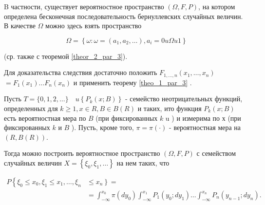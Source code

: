 B частности, существует вероятностное пространство $(\Omega, {F}, {P})$, на котором определена бесконечная последовательность бернуллевских случайных величин. В качестве $\Omega$ можно здесь взять пространство

$$
\Omega=\left\{\omega: \omega=\left(a_{1}, a_{2}, \ldots\right), a_{i}=0 u \Omega u 1\right\}
$$

(ср. также с теоремой \ref{theor_2_par_3}).

Для доказательства следствия достаточно положить 
\newline
$F_{1, \ldots, n}\left(x_{1}, \ldots, x_{n}\right)$ $=F_{1}\left(x_{1}\right) \ldots F_{n}\left(x_{n}\right)$
\newline
и применить теорему \ref{theo_1_par_3} .



\begin{corollary} Пусть $T=\{0,1,2, \ldots\} \quad u\left\{P_{k}(x ; B)\right\}$ - семейство неотрицательных функций, определенных для $k \geqslant 1, x \in R, B \in {B}(R)$ и таких, ито функция $P_{k}(x ; B)$ есть вероятностная мера по $B$ (при фиксированных $k$ u ) и измерима по х (при фиксированных $k$ и $B$ ). Пусть, кроме того, $\pi=\pi(\cdot)$ - вероятностная мера на $(R, {B}(R))$.

Тогда можно построить вероятностное пространство $(\Omega, {F}, {P})$ с семейством случайных величин $X=\left\{\xi_{0}, \xi_{1}, \ldots\right\}$ на нем таких, что

$$
\begin{aligned}
{P}\left\{\xi_{0} \leqslant x_{0}, \xi_{1} \leqslant x_{1}, \ldots, \xi_{n}\right. & \left.\leqslant x_{n}\right\}= \\
& =\int_{-\infty}^{x_{0}} \pi\left(d y_{0}\right) \int_{-\infty}^{x_{1}} P_{1}\left(y_{0} ; d y_{1}\right) \ldots \int_{-\infty}^{x_{n}} P_{n}\left(y_{n-1} ; d y_{n}\right) .
\end{aligned}
$$
\end{corollary}


